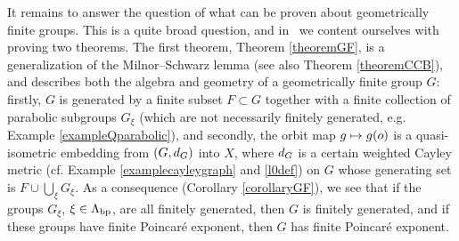 It remains to answer the question of what can be proven about geometrically finite groups. This is a quite broad question, and in \thispaper\ we content ourselves with proving two theorems. The first theorem, Theorem \ref{theoremGF}, is a generalization of the Milnor--Schwarz lemma \cite[Proposition I.8.19]{BridsonHaefliger} (see also Theorem \ref{theoremCCB}), and describes both the algebra and geometry of a geometrically finite group $G$: firstly, $G$ is generated by a finite subset $F\subset G$ together with a finite collection of parabolic subgroups $G_\xi$ (which are not necessarily finitely generated, e.g. Example \ref{exampleQparabolic}), and secondly, the orbit map $g\mapsto g(o)$ is a quasi-isometric embedding from $(G,d_G)$ into $X$, where $d_G$ is a certain weighted Cayley metric (cf. Example \ref{examplecayleygraph} and \eqref{l0def}) on $G$ whose generating set is $F\cup \bigcup_\xi G_\xi$. As a consequence (Corollary \ref{corollaryGF}), we see that if the groups $G_\xi$, $\xi\in\Lambda_{\mathrm{bp}}$, are all finitely generated, then $G$ is finitely generated, and if these groups have finite Poincar\'e exponent, then $G$ has finite Poincar\'e exponent.

